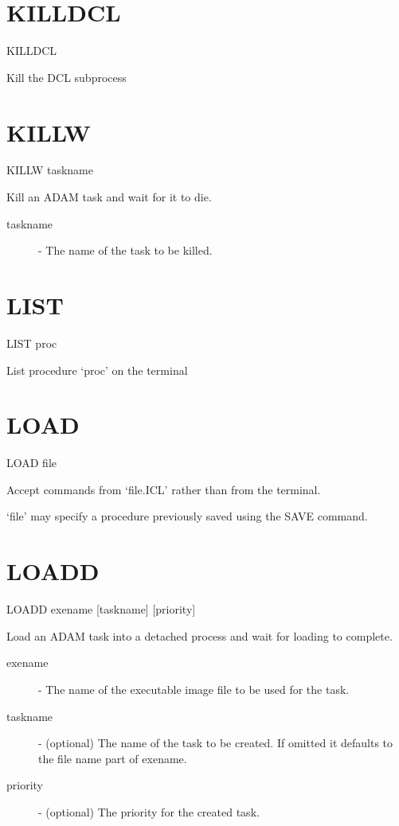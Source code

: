 \section{KILLDCL}

    KILLDCL

 Kill the DCL subprocess

\section{KILLW}

    KILLW \hspace{.5cm} taskname

 Kill an ADAM task and wait for it to die.

\begin{description}

\item[taskname] -  The name of the task to be killed.

\end{description}

\section{LIST}

    LIST \hspace{.5cm} proc

 List procedure `proc' on the terminal

\section{LOAD}  

    LOAD  file

 Accept commands from `file.ICL' rather than from the terminal.

 `file' may specify a procedure previously saved using the SAVE command.

\section{LOADD}


    LOADD \hspace{.5cm} exename \hspace{.5cm} [taskname] \hspace{.5cm} [priority]

    Load an ADAM task into a detached process and wait for
    loading to complete.
\begin{description}

\item[exename] - The name of the executable image file to
            be used for the task.

\item[taskname] - (optional) The name of the task to be created.
            If omitted it defaults to the file name part of
            exename.

\item[priority] - (optional) The priority for the created task.

\end{description}

